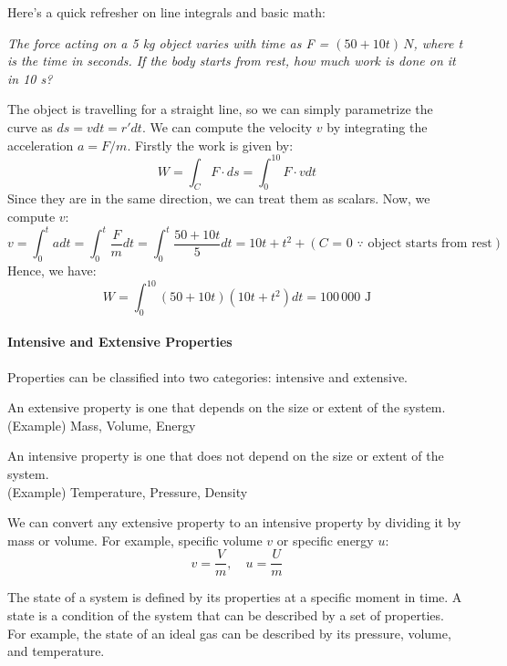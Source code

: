 \documentclass[11pt]{report}
\begin{document}
\begin{shaded}
Here's a quick refresher on line integrals and basic math:
\begin{example}
    \textit{The force acting on a 5 kg object varies with time as F = $(50 + 10t)\,N$, where t is the time in seconds. If the body starts from rest, how much work is done on it in 10 s?}

    The object is travelling for a straight line, so we can simply parametrize the curve as $ds = v dt = r' dt$. We can compute the velocity $v$ by integrating the acceleration $a = F/m$. Firstly the work is given by:
    $$
        W = \int_{C} F \cdot ds = \int_0^{10} F \cdot v dt
    $$
    Since they are in the same direction, we can treat them as scalars. Now, we compute $v$:
    $$
        v = \int_0^t a dt = \int_0^t \frac{F}{m} dt = \int_0^t \frac{50 + 10t}{5} dt = 10t + t^2 + (\text{$C$ = 0 $\because$ object starts from rest})
    $$
    Hence, we have:
    $$
        W = \int_0^{10} (50 + 10t)(10t + t^2) dt = 100\,000 \text{ J}
    $$
\end{example}

\end{shaded}
\paragraph{Intensive and Extensive Properties} Properties can be classified into two categories: intensive and extensive.
\begin{definition}
    An extensive property is one that depends on the size or extent of the system. \\
    (Example) Mass, Volume, Energy
\end{definition}    
\begin{definition}
    An intensive property is one that does not depend on the size or extent of the system. \\ 
    (Example) Temperature, Pressure, Density 

    We can convert any extensive property to an intensive property by dividing it by mass or volume. For example, specific volume $v$ or specific energy $u$:
    $$
        v = \frac{V}{m}, \quad u = \frac{U}{m}
    $$
\end{definition}

\begin{definition}[State]
    The state of a system is defined by its properties at a specific moment in time. A state is a condition of the system that can be described by a set of properties. For example, the state of an ideal gas can be described by its pressure, volume, and temperature.
    
\end{definition}
\end{document}
